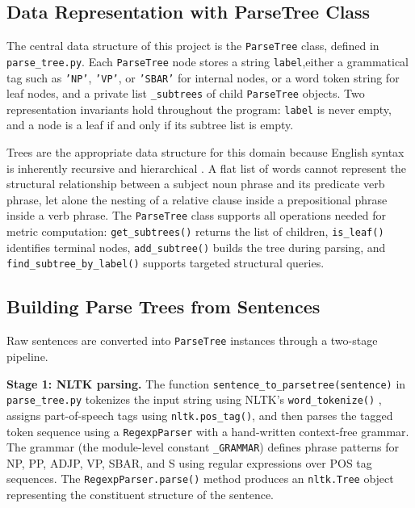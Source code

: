 \documentclass[11pt]{article}
\begin{document}
\subsection*{Data Representation with ParseTree Class}
 
The central data structure of this project is the \texttt{ParseTree} class, defined in \texttt{parse\_tree.py}. Each \texttt{ParseTree} node stores a string \texttt{label},either a grammatical tag such as \texttt{'NP'}, \texttt{'VP'}, or \texttt{'SBAR'} for internal nodes, or a word token string for leaf nodes, and a private list \texttt{\_subtrees} of child \texttt{ParseTree} objects. Two representation invariants hold throughout the program: \texttt{label} is never empty, and a node is a leaf if and only if its subtree list is empty.
 
Trees are the appropriate data structure for this domain because English syntax is inherently recursive and hierarchical \cite{carla}. A flat list of words cannot represent the structural relationship between a subject noun phrase and its predicate verb phrase, let alone the nesting of a relative clause inside a prepositional phrase inside a verb phrase. The \texttt{ParseTree} class supports all operations needed for metric computation: \texttt{get\_subtrees()} returns the list of children, \texttt{is\_leaf()} identifies terminal nodes, \texttt{add\_subtree()} builds the tree during parsing, and \texttt{find\_subtree\_by\_label()} supports targeted structural queries.
 
\subsection*{Building Parse Trees from Sentences}
 
Raw sentences are converted into \texttt{ParseTree} instances through a two-stage pipeline.
 
\textbf{Stage 1: NLTK parsing.} The function \texttt{sentence\_to\_parsetree(sentence)} in \texttt{parse\_tree.py} tokenizes the input string using NLTK's \texttt{word\_tokenize()} \cite{nltk}, assigns part-of-speech tags using \texttt{nltk.pos\_tag()}, and then parses the tagged token sequence using a \texttt{RegexpParser} with a hand-written context-free grammar. The grammar (the module-level constant \texttt{\_GRAMMAR}) defines phrase patterns for NP, PP, ADJP, VP, SBAR, and S using regular expressions over POS tag sequences. The \texttt{RegexpParser.parse()} method produces an \texttt{nltk.Tree} object representing the constituent structure of the sentence.
 
\end{document}

